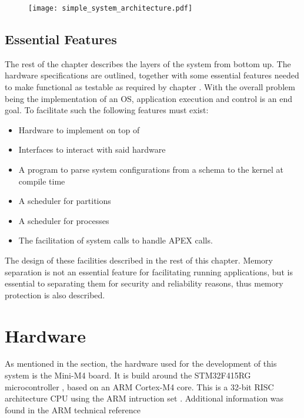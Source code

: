 \begin{figure}[H]
\centering
\texttt{[image: simple\_system\_architecture.pdf]}
\label{fig:simple_system}
\end{figure}


\subsection{Essential Features}
\label{design:features}
The rest of the chapter describes the layers of the system from bottom up.
The hardware specifications are outlined, together with some essential features
needed to make \OSname{} functional as testable as required by chapter
.
With the overall problem being the implementation of an \arinc{} OS,
application execution and control is an end goal.
To facilitate such the following features must exist:
\begin{itemize}
	\item Hardware to implement on top of
	\item Interfaces to interact with said hardware
	\item A program to parse system configurations from a schema to the kernel at compile time
	\item A scheduler for partitions
	\item A scheduler for processes
	\item The facilitation of system calls to handle APEX calls.
\end{itemize}

The design of these facilities described in the rest of this chapter.
Memory separation is not an essential feature for facilitating running applications,
but is essential to separating them for security and reliability reasons,
thus memory protection is also described.


\section{Hardware}
As mentioned in the  section,
the hardware used for the development of this system is the Mini-M4
board. It is build around the STM32F415RG microcontroller
\cite{stm32_datasheet}, based on
an ARM Cortex-M4 core. This is a 32-bit RISC architecture CPU using 
the ARM intruction set \cite{arm_architecture}. Additional information
was found in the ARM technical reference \cite{arm_technical} 

